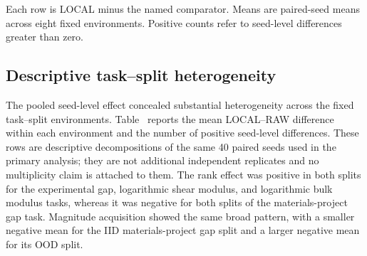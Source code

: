 \documentclass[11pt]{article}
\begin{document}
\begin{table}[ht]
\centering
\caption{Complete primary contrast summary.}
\label{tab:full}
\small
{}%
\begin{flushleft}\footnotesize Each row is LOCAL minus the named comparator. Means are paired-seed means across eight fixed environments. Positive counts refer to seed-level differences greater than zero.\end{flushleft}
\end{table}

\subsection{Descriptive task--split heterogeneity}
The pooled seed-level effect concealed substantial heterogeneity across the fixed task--split environments. Table~ reports the mean LOCAL--RAW difference within each environment and the number of positive seed-level differences. These rows are descriptive decompositions of the same 40 paired seeds used in the primary analysis; they are not additional independent replicates and no multiplicity claim is attached to them. The rank effect was positive in both splits for the experimental gap, logarithmic shear modulus, and logarithmic bulk modulus tasks, whereas it was negative for both splits of the materials-project gap task. Magnitude acquisition showed the same broad pattern, with a smaller negative mean for the IID materials-project gap split and a larger negative mean for its OOD split.
\end{document}
